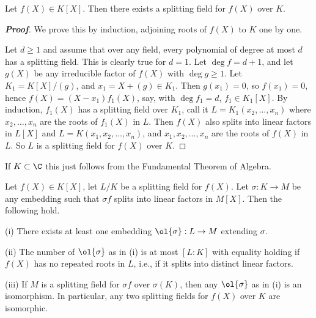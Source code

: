 \begin{theorem}
Let $f(X) \in K[X]$. Then there exists a splitting field for $f(X)$ over $K$.
\end{theorem}

\begin{proof}[\bf Proof]
We prove this by induction, adjoining roots of $f(X)$ to $K$ one by one.

Let $d \geq 1$ and assume that over any field, every polynomial of degree at most $d$ has a splitting field. This is clearly true for $d = 1$. Let $\deg f = d + 1$, and let $g(X)$ be any irreducible factor of $f(X)$ with $\deg g \geq 1$. Let $K_1 = K[X]/(g)$, and $x_1 = X +(g) \in K_1$. Then $g(x_1) = 0$, so $f(x_1) = 0$, hence $f(X) = (X - x_1)f_1(X)$, say, with $\deg f_1 = d$, $f_1 \in K_1[X]$. By induction, $f_1(X)$ has a splitting field over $K_1$, call it $L = K_1(x_2, \dots , x_n)$ where $x_2, \dots , x_n$ are the roots of $f_1(X)$ in $L$. Then $f(X)$ also splits into linear factors in $L[X]$ and $L = K(x_1, x_2, \dots , x_n)$, and $x_1, x_2, \dots , x_n$ are the roots of $f(X)$ in $L$. So $L$ is a splitting field for $f(X)$ over $K$.
\end{proof}

\begin{remark}
If $K \subset \C$ this just follows from the Fundamental Theorem of Algebra.
\end{remark}

\begin{theorem}
Let $f(X) \in K[X]$, let $L/K$ be a splitting field for $f(X)$. Let $\sigma : K \to M$ be any embedding such that $\sigma f$ splits into linear factors in $M[X]$. Then the following hold.

\ben
\item [(i)] There exists at least one embedding $\ol{\sigma} : L \to M$ extending $\sigma$.
\item [(ii)] The number of $\ol{\sigma}$ as in (i) is at most $[L : K]$ with equality holding if $f(X)$ has no repeated roots in $L$, i.e., if it splits into distinct linear factors.
\item [(iii)] If $M$ is a splitting field for $\sigma f$ over $\sigma(K)$, then any $\ol{\sigma}$ as in (i) is an isomorphism. In particular, any two splitting fields for $f(X)$ over $K$ are isomorphic.
\een
\end{theorem}

